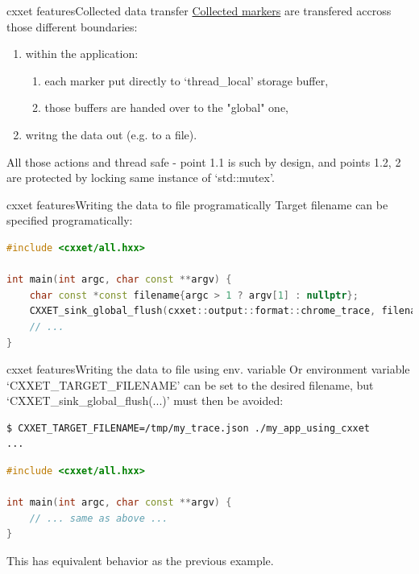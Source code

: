 \documentclass[aspectratio=169]{beamer}
\begin{document}
\begin{frame}{cxxet features}{Collected data transfer}
    \hyperlink{writing_out_data}{Collected markers} are transfered accross those different boundaries:

    \begin{enumerate}
        \item within the application:
        \begin{enumerate}
            \item each marker put directly to `thread\_local' storage buffer,
            \item those buffers are handed over to the "global" one,
        \end{enumerate}
        \item writng the data out (e.g. to a file).
    \end{enumerate}

    All those actions and thread safe - point 1.1 is such by design, and points 1.2, 2 are protected by locking same instance of `std::mutex'.

\end{frame}

\begin{frame}[fragile]{cxxet features}{Writing the data to file programatically}
    Target filename can be specified programatically:

    \begin{lstlisting}[language=C++]
#include <cxxet/all.hxx>

int main(int argc, char const **argv) {
    char const *const filename{argc > 1 ? argv[1] : nullptr};
    CXXET_sink_global_flush(cxxet::output::format::chrome_trace, filename, true); // `true' means to defer the flush - in the destructor of the "global" buffer
    // ...
}
    \end{lstlisting}

\end{frame}

\begin{frame}[fragile]{cxxet features}{Writing the data to file using env. variable}
    Or environment variable `CXXET\_TARGET\_FILENAME' can be set to the desired filename, but `CXXET\_sink\_global\_flush(...)' must then be avoided:

    \begin{lstlisting}[language=bash]
$ CXXET_TARGET_FILENAME=/tmp/my_trace.json ./my_app_using_cxxet
...
    \end{lstlisting}

    \begin{lstlisting}[language=C++]
#include <cxxet/all.hxx>

int main(int argc, char const **argv) {
    // ... same as above ...
}
    \end{lstlisting}

    This has equivalent behavior as the previous example.
\end{frame}
\end{document}
